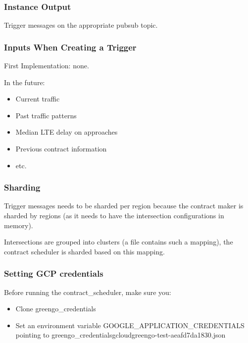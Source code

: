 \documentclass[letterpaper,10pt,english]{sphinxmanual}
\begin{document}
\subsubsection{Instance Output}
\label{\detokenize{microservices/contract_scheduler/introduction:instance-output}}
Trigger messages on the appropriate pubsub topic.


\subsubsection{Inputs When Creating a Trigger}
\label{\detokenize{microservices/contract_scheduler/introduction:inputs-when-creating-a-trigger}}
First Implementation: none.

In the future:
\begin{itemize}
\item {} 
Current traffic

\item {} 
Past traffic patterns

\item {} 
Median LTE delay on approaches

\item {} 
Previous contract information

\item {} 
etc.

\end{itemize}


\subsubsection{Sharding}
\label{\detokenize{microservices/contract_scheduler/introduction:sharding}}
Trigger messages needs to be sharded per region because the contract maker is sharded by regions (as it needs to have the intersection configurations in memory).

Intersections are grouped into clusters (a file contains such a mapping), the contract scheduler is sharded based on this mapping.


\subsubsection{Setting GCP credentials}
\label{\detokenize{microservices/contract_scheduler/introduction:setting-gcp-credentials}}
Before running the contract\_scheduler, make sure you:
\begin{itemize}
\item {} 
Clone greengo\_credentials

\item {} 
Set an environment variable GOOGLE\_APPLICATION\_CREDENTIALS pointing to greengo\_credentialsgcloudgreengo-test-aeafd7da1830.json

\end{itemize}
\end{document}
